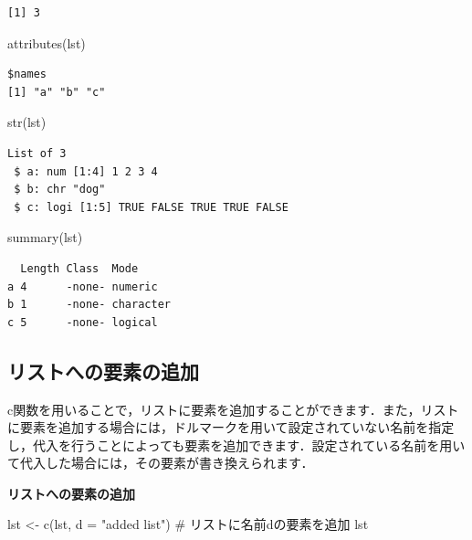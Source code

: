 \documentclass[
  letterpaper,
  DIV=11,
  numbers=noendperiod]{scrreprt}
\newenvironment{Shaded}{\begin{snugshade}}{\end{snugshade}}
\newcommand{\AttributeTok}[1]{\textcolor[rgb]{0.40,0.45,0.13}{#1}}
\newcommand{\CommentTok}[1]{\textcolor[rgb]{0.37,0.37,0.37}{#1}}
\newcommand{\FunctionTok}[1]{\textcolor[rgb]{0.28,0.35,0.67}{#1}}
\newcommand{\NormalTok}[1]{\textcolor[rgb]{0.00,0.23,0.31}{#1}}
\newcommand{\OtherTok}[1]{\textcolor[rgb]{0.00,0.23,0.31}{#1}}
\newcommand{\StringTok}[1]{\textcolor[rgb]{0.13,0.47,0.30}{#1}}
\begin{document}
\begin{verbatim}
[1] 3
\end{verbatim}

\begin{Shaded}
\begin{Highlighting}[]
\FunctionTok{attributes}\NormalTok{(lst)}
\end{Highlighting}
\end{Shaded}

\begin{verbatim}
$names
[1] "a" "b" "c"
\end{verbatim}

\begin{Shaded}
\begin{Highlighting}[]
\FunctionTok{str}\NormalTok{(lst)}
\end{Highlighting}
\end{Shaded}

\begin{verbatim}
List of 3
 $ a: num [1:4] 1 2 3 4
 $ b: chr "dog"
 $ c: logi [1:5] TRUE FALSE TRUE TRUE FALSE
\end{verbatim}

\begin{Shaded}
\begin{Highlighting}[]
\FunctionTok{summary}\NormalTok{(lst)}
\end{Highlighting}
\end{Shaded}

\begin{verbatim}
  Length Class  Mode     
a 4      -none- numeric  
b 1      -none- character
c 5      -none- logical  
\end{verbatim}

\hypertarget{ux30eaux30b9ux30c8ux3078ux306eux8981ux7d20ux306eux8ffdux52a0}{%
\subsection{リストへの要素の追加}\label{ux30eaux30b9ux30c8ux3078ux306eux8981ux7d20ux306eux8ffdux52a0}}

c関数を用いることで，リストに要素を追加することができます．また，リストに要素を追加する場合には，ドルマークを用いて設定されていない名前を指定し，代入を行うことによっても要素を追加できます．設定されている名前を用いて代入した場合には，その要素が書き換えられます．

\textbf{リストへの要素の追加}

\begin{Shaded}
\begin{Highlighting}[]
\NormalTok{lst }\OtherTok{\textless{}{-}} \FunctionTok{c}\NormalTok{(lst, }\AttributeTok{d =} \StringTok{"added list"}\NormalTok{) }\CommentTok{\# リストに名前dの要素を追加}
\NormalTok{lst}
\end{Highlighting}
\end{Shaded}
\end{document}
